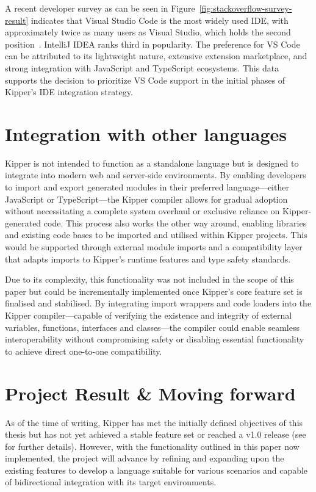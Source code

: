 A recent developer survey as can be seen in Figure~\ref{fig:stackoverflow-survey-result} indicates that Visual Studio Code is the most widely used IDE, with approximately twice as many users as Visual Studio, which holds the second position~\cite{stackoverflow2024}. IntelliJ IDEA ranks third in popularity. The preference for VS Code can be attributed to its lightweight nature, extensive extension marketplace, and strong integration with JavaScript and TypeScript ecosystems. This data supports the decision to prioritize VS Code support in the initial phases of Kipper's IDE integration strategy.

\section{Integration with other languages}

Kipper is not intended to function as a standalone language but is designed to integrate into modern web and server-side environments. By enabling developers to import and export generated modules in their preferred language—either JavaScript or TypeScript—the Kipper compiler allows for gradual adoption without necessitating a complete system overhaul or exclusive reliance on Kipper-generated code. This process also works the other way around, enabling libraries and existing code bases to be imported and utilised within Kipper projects. This would be supported through external module imports and a compatibility layer that adapts imports to Kipper's runtime features and type safety standards.

Due to its complexity, this functionality was not included in the scope of this paper but could be incrementally implemented once Kipper's core feature set is finalised and stabilised. By integrating import wrappers and code loaders into the Kipper compiler—capable of verifying the existence and integrity of external variables, functions, interfaces and classes—the compiler could enable seamless interoperability without compromising safety or disabling essential functionality to achieve direct one-to-one compatibility.

\section{Project Result \& Moving forward}

As of the time of writing, Kipper has met the initially defined objectives of this thesis but has not yet achieved a stable feature set or reached a v1.0 release (see  for further details). However, with the functionality outlined in this paper now implemented, the project will advance by refining and expanding upon the existing features to develop a language suitable for various scenarios and capable of bidirectional integration with its target environments.

